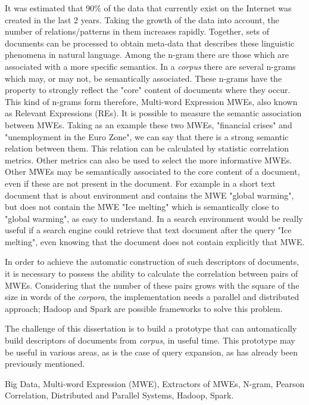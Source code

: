 It was estimated that 90\% of the data that currently exist on the Internet was created in the last 2 years. Taking the growth of the data into account, the number of relations/patterns in them increases rapidly. Together, sets of documents can be processed to obtain meta-data that describes these linguistic phenomena in natural language. Among the n-gram there are those which are associated with a more specific semantics. In a \textit{corpus} there are several n-grams which may, or may not, be semantically associated. These n-grams have the property to strongly reflect the "core" content of documents where they occur. This kind of n-grams form therefore, Multi-word Expression MWEs, also known as Relevant Expressions (REs). It is possible to measure the semantic association between MWEs. Taking as an example these two MWEs, "financial crises" and "unemployment in the Euro Zone", we can say that there is a strong semantic relation between them. This relation can be calculated by statistic correlation metrics. Other metrics can also be used to select the more informative MWEs. Other MWEs may be semantically associated to the core content of a document, even if these are not present in the document. For example in a short text document that is about environment and contains the MWE "global warming", but does not contain the MWE "Ice melting" which is semantically close to "global warming", as easy to understand. In a search environment would be really useful if a search engine could retrieve that text document after the query "Ice melting", even knowing that the document does not contain explicitly that MWE. 

In order to achieve the automatic construction of such descriptors of documents, it is necessary to possess the ability to calculate the correlation between pairs of MWEs. Considering that the number of these pairs grows with the square of the size in words of the \textit{corpora}, the implementation needs a parallel and distributed approach; Hadoop and Spark are possible frameworks to solve this problem. 

The challenge of this dissertation is to build a prototype that can automatically build descriptors of documents from \textit{corpus}, in useful time. This prototype may be useful in various areas, as is the case of query expansion, as has already been previously mentioned.

\begin{keywords}
Big Data, Multi-word Expression (MWE), Extractors of MWEs, N-gram, Pearson Correlation, Distributed and Parallel Systems, Hadoop, Spark.
\end{keywords}
